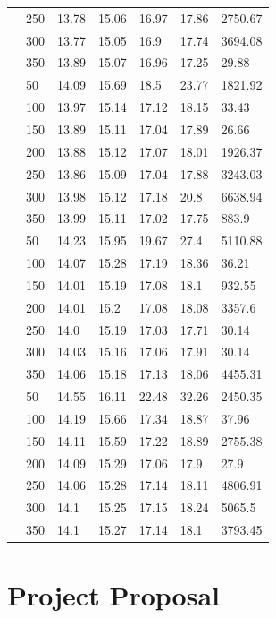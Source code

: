 \documentclass[12pt,a4paper,twoside,openany]{report}
\begin{document}
\begin{longtable}{@{} l l l l l l l @{}}
& 250 & 13.78 & 15.06 & 16.97 & 17.86 & 2750.67 \\
& 300 & 13.77 & 15.05 & 16.9 & 17.74 & 3694.08 \\
& 350 & 13.89 & 15.07 & 16.96 & 17.25 & 29.88 \\
\hline
\pagebreak[3]
80 & 50 & 14.09 & 15.69 & 18.5 & 23.77 & 1821.92 \\
& 100 & 13.97 & 15.14 & 17.12 & 18.15 & 33.43 \\
& 150 & 13.89 & 15.11 & 17.04 & 17.89 & 26.66 \\
& 200 & 13.88 & 15.12 & 17.07 & 18.01 & 1926.37 \\
& 250 & 13.86 & 15.09 & 17.04 & 17.88 & 3243.03 \\
& 300 & 13.98 & 15.12 & 17.18 & 20.8 & 6638.94 \\
& 350 & 13.99 & 15.11 & 17.02 & 17.75 & 883.9 \\
\hline
\pagebreak[4]
90 & 50 & 14.23 & 15.95 & 19.67 & 27.4 & 5110.88 \\
& 100 & 14.07 & 15.28 & 17.19 & 18.36 & 36.21 \\
& 150 & 14.01 & 15.19 & 17.08 & 18.1 & 932.55 \\
& 200 & 14.01 & 15.2 & 17.08 & 18.08 & 3357.6 \\
& 250 & 14.0 & 15.19 & 17.03 & 17.71 & 30.14 \\
& 300 & 14.03 & 15.16 & 17.06 & 17.91 & 30.14 \\
& 350 & 14.06 & 15.18 & 17.13 & 18.06 & 4455.31 \\
\hline
\pagebreak[3]
100 & 50 & 14.55 & 16.11 & 22.48 & 32.26 & 2450.35 \\
& 100 & 14.19 & 15.66 & 17.34 & 18.87 & 37.96 \\
& 150 & 14.11 & 15.59 & 17.22 & 18.89 & 2755.38 \\
& 200 & 14.09 & 15.29 & 17.06 & 17.9 & 27.9 \\
& 250 & 14.06 & 15.28 & 17.14 & 18.11 & 4806.91 \\
& 300 & 14.1 & 15.25 & 17.15 & 18.24 & 5065.5 \\
& 350 & 14.1 & 15.27 & 17.14 & 18.1 & 3793.45 \\
\bottomrule
\end{longtable}

\chapter{Project Proposal}


\end{document}
